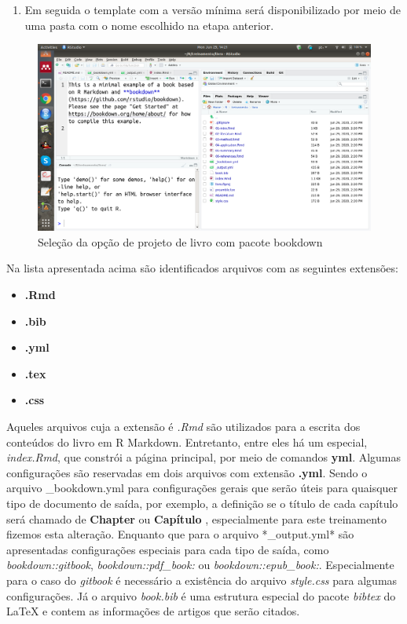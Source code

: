 \documentclass[]{book}
\providecommand{\tightlist}{%
  \setlength{\itemsep}{0pt}\setlength{\parskip}{0pt}}
\begin{document}
\begin{enumerate}
\def\labelenumi{\arabic{enumi}.}
\setcounter{enumi}{3}
\tightlist
\item
  Em seguida o template com a versão mínima será disponibilizado por
  meio de uma pasta com o nome escolhido na etapa anterior.
\end{enumerate}

\begin{figure}
\centering
\includegraphics{fig/outra.png}
\caption{Seleção da opção de projeto de livro com pacote bookdown}
\end{figure}

Na lista apresentada acima são identificados arquivos com as seguintes
extensões:

\begin{itemize}
\tightlist
\item
  \textbf{.Rmd}
\item
  \textbf{.bib}
\item
  \textbf{.yml}
\item
  \textbf{.tex}
\item
  \textbf{.css}
\end{itemize}

Aqueles arquivos cuja a extensão é \emph{.Rmd} são utilizados para a
escrita dos conteúdos do livro em R Markdown. Entretanto, entre eles há
um especial, \emph{index.Rmd}, que constrói a página principal, por meio
de comandos \textbf{yml}. Algumas configurações são reservadas em dois
arquivos com extensão \textbf{.yml}. Sendo o arquivo \_bookdown.yml para
configurações gerais que serão úteis para quaisquer tipo de documento de
saída, por exemplo, a definição se o título de cada capítulo será
chamado de \textbf{Chapter } ou \textbf{Capítulo }, especialmente para
este treinamento fizemos esta alteração. Enquanto que para o arquivo
*\_output.yml* são apresentadas configurações especiais para cada tipo
de saída, como \emph{bookdown::gitbook}, \emph{bookdown::pdf\_book:} ou
\emph{bookdown::epub\_book:}. Especialmente para o caso do
\emph{gitbook} é necessário a existência do arquivo \emph{style.css}
para algumas configurações. Já o arquivo \emph{book.bib} é uma estrutura
especial do pacote \emph{bibtex} do LaTeX e contem as informações de
artigos que serão citados.
\end{document}

